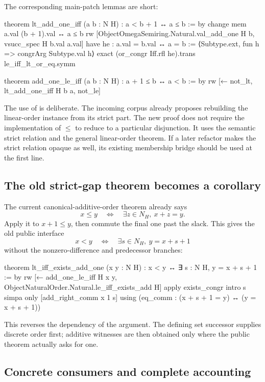\documentclass[11pt,letterpaper]{article}
\newcommand{\code}[1]{\texttt{\small\detokenize{#1}}}
\begin{document}
The corresponding main-patch lemmas are short:

\begin{Lean}
theorem lt_add_one_iff (a b : N H) : a < b + 1 ↔ a ≤ b := by
  change mem a.val (b + 1).val ↔ a ≤ b
  rw [ObjectOmegaSemiring.Natural.val_add_one H b,
    vsucc_spec H b.val a.val]
  have he : a.val = b.val ↔ a = b :=
    ⟨Subtype.ext, fun h => congrArg Subtype.val h⟩
  exact (or_congr Iff.rfl he).trans le_iff_lt_or_eq.symm

theorem add_one_le_iff (a b : N H) : a + 1 ≤ b ↔ a < b := by
  rw [← not_lt, lt_add_one_iff H b a, not_le]
\end{Lean}

The use of \code{le_iff_lt_or_eq} is deliberate. The incoming corpus already proposes rebuilding the linear-order instance from its strict part. The new proof does not require the implementation of $\le$ to reduce to a particular disjunction. It uses the semantic strict relation and the general linear-order theorem. If a later refactor makes the strict relation opaque as well, its existing membership bridge should be used at the first line.

\subsection{The old strict-gap theorem becomes a corollary}

The current canonical-additive-order theorem already says
\[
  x\le y\quad\Longleftrightarrow\quad\exists z\in N_H,\ x+z=y.
\]
Apply it to $x+1\le y$, then commute the final one past the slack. This gives the old public interface
\[
  x<y\quad\Longleftrightarrow\quad\exists s\in N_H,\ y=x+s+1
\]
without the nonzero-difference and predecessor branches:

\begin{Lean}
theorem lt_iff_exists_add_one (x y : N H) :
    x < y ↔ ∃ s : N H, y = x + s + 1 := by
  rw [← add_one_le_iff H x y,
    ObjectNaturalOrder.Natural.le_iff_exists_add H]
  apply exists_congr
  intro s
  simpa only [add_right_comm x 1 s] using
    (eq_comm : (x + s + 1 = y) ↔ (y = x + s + 1))
\end{Lean}

This reverses the dependency of the argument. The defining set successor supplies discrete order first; additive witnesses are then obtained only where the public theorem actually asks for one.

\subsection{Concrete consumers and complete accounting}
\end{document}
